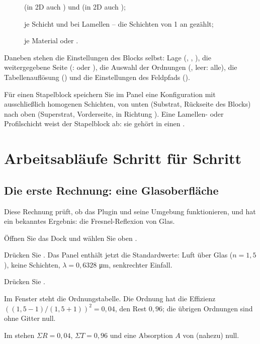 \begin{description}
  \item[]  (in 2D auch ) und
     (in 2D auch );
  \item[] je Schicht  und bei Lamellen
     -- die Schichten von 1 an gezählt;
  \item[] je Material  oder .
\end{description}

Daneben stehen die Einstellungen des Blocks selbst: Lage (, , ), die weitergegebene Seite (:  oder
), die Auswahl der Ordnungen (, leer: alle), die Tabellenauflösung
() und die Einstellungen des Feldpfads ().

\begin{tipp}
Für einen Stapelblock speichern Sie im Panel eine Konfiguration mit ausschließlich homogenen
Schichten, von unten (Substrat, Rückseite des Blocks) nach oben (Superstrat, Vorderseite, in
Richtung ). Eine Lamellen- oder Profilschicht weist der Stapelblock ab: sie gehört in
einen .
\end{tipp}

\section{Arbeitsabläufe Schritt für Schritt}\label{sec:fg-ablaeufe}

\subsection{Die erste Rechnung: eine Glasoberfläche}\label{sec:fg-ablauf-erste}

Diese Rechnung prüft, ob das Plugin und seine Umgebung funktionieren, und hat ein bekanntes
Ergebnis: die Fresnel-Reflexion von Glas.

\begin{schritte}
  \item Öffnen Sie das Dock  und wählen Sie oben .
  \item Drücken Sie . Das Panel enthält jetzt die Standardwerte: Luft über
    Glas ($n = 1{,}5$), keine Schichten, $\lambda = 0{,}6328$ \si{\micro\metre}, senkrechter Einfall.
  \item Drücken Sie .
  \item Im Fenster  steht die Ordnungstabelle. Die Ordnung  hat die Effizienz
    $((1{,}5-1)/(1{,}5+1))^2 = 0{,}04$,  den Rest $0{,}96$; die übrigen Ordnungen sind
    ohne Gitter null.
  \item Im  stehen $\Sigma R = 0{,}04$, $\Sigma T = 0{,}96$ und eine Absorption $A$ von (nahezu) null.
\end{schritte}

